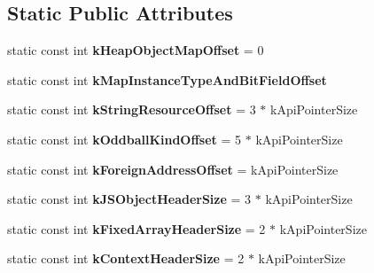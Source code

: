 \subsection*{Static Public Attributes}
\begin{DoxyCompactItemize}
\item 
static const int {\bfseries k\+Heap\+Object\+Map\+Offset} = 0\hypertarget{classv8_1_1internal_1_1Internals_a0902a596b5656b4592157eaacc020512}{}\label{classv8_1_1internal_1_1Internals_a0902a596b5656b4592157eaacc020512}

\item 
static const int {\bfseries k\+Map\+Instance\+Type\+And\+Bit\+Field\+Offset}
\item 
static const int {\bfseries k\+String\+Resource\+Offset} = 3 $\ast$ k\+Api\+Pointer\+Size\hypertarget{classv8_1_1internal_1_1Internals_a8c2b35069864f567ca0c571310dd90a1}{}\label{classv8_1_1internal_1_1Internals_a8c2b35069864f567ca0c571310dd90a1}

\item 
static const int {\bfseries k\+Oddball\+Kind\+Offset} = 5 $\ast$ k\+Api\+Pointer\+Size\hypertarget{classv8_1_1internal_1_1Internals_a98685d6861a07139720cd296f94f2b73}{}\label{classv8_1_1internal_1_1Internals_a98685d6861a07139720cd296f94f2b73}

\item 
static const int {\bfseries k\+Foreign\+Address\+Offset} = k\+Api\+Pointer\+Size\hypertarget{classv8_1_1internal_1_1Internals_ad4134449ee39b95e5ac035996aa7d66b}{}\label{classv8_1_1internal_1_1Internals_ad4134449ee39b95e5ac035996aa7d66b}

\item 
static const int {\bfseries k\+J\+S\+Object\+Header\+Size} = 3 $\ast$ k\+Api\+Pointer\+Size\hypertarget{classv8_1_1internal_1_1Internals_af8faf3ff3271d26bafa6ca0ea87e2a57}{}\label{classv8_1_1internal_1_1Internals_af8faf3ff3271d26bafa6ca0ea87e2a57}

\item 
static const int {\bfseries k\+Fixed\+Array\+Header\+Size} = 2 $\ast$ k\+Api\+Pointer\+Size\hypertarget{classv8_1_1internal_1_1Internals_a715ca62a5ddceac28d43c470db067675}{}\label{classv8_1_1internal_1_1Internals_a715ca62a5ddceac28d43c470db067675}

\item 
static const int {\bfseries k\+Context\+Header\+Size} = 2 $\ast$ k\+Api\+Pointer\+Size\hypertarget{classv8_1_1internal_1_1Internals_aa5187d7653158ef851c53594e6e63851}{}\label{classv8_1_1internal_1_1Internals_aa5187d7653158ef851c53594e6e63851}


\end{DoxyCompactItemize}

